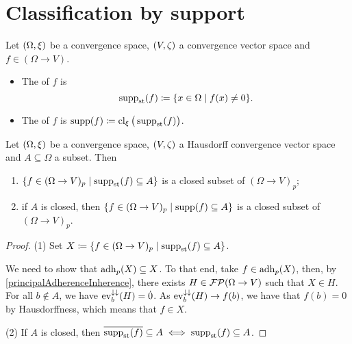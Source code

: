 \section{Classification by support}
\begin{definition}
Let $\left( \Omega, \xi \right)$ be a convergence space, $\left( V,\zeta \right)$ a convergence vector space and $f\in (\Omega\to V)$.
\begin{itemize}
\item The  of $f$ is
\[ \supp_\text{st}(f) \defeq \setbuilder{x\in \Omega}{f(x) \neq 0}. \]
\item The  of $f$ is $\operatorname{supp}(f) \coloneqq \operatorname{cl}_\xi\big(\operatorname{supp}_\text{st}(f)\big)$.
\end{itemize}
\end{definition}

\begin{lemma}
Let $\left( \Omega, \xi \right)$ be a convergence space, $\left( V,\zeta \right)$ a Hausdorff convergence vector space and $A\subseteq \Omega$ a subset. Then
\begin{enumerate}
\item $\setbuilder{f\in (\Omega\to V)_p}{\supp_\text{st}(f)\subseteq A}$ is a closed subset of $(\Omega\to V)_p$;
\item if $A$ is closed, then $\setbuilder{f\in (\Omega\to V)_p}{\supp(f)\subseteq A}$ is a closed subset of $(\Omega\to V)_p$.
\end{enumerate}
\end{lemma}
\begin{proof}
(1) Set $X \defeq \setbuilder{f\in (\Omega\to V)_p}{\supp_\text{st}(f)\subseteq A}$.

We need to show that $\operatorname{adh}_p(X) \subseteq X$. To that end, take $f\in \operatorname{adh}_p(X)$, then, by \ref{principalAdherenceInherence}, there exists $H\in \operatorname{\mathcal{FP}}(\Omega\to V)$ such that $X\in H$. For all $b\notin A$, we have $\operatorname{ev}_b^{\downarrow\downarrow}(H) = \dot{0}$. As $\operatorname{ev}_b^{\downarrow\downarrow}(H) \to f(b)$, we have that $f(b) = 0$ by Hausdorffness, which means that $f\in X$.

(2) If $A$ is closed, then $\overline{\operatorname{supp}_\text{st}(f)}\subseteq A \iff \operatorname{supp}_\text{st}(f) \subseteq A$.
\end{proof}

